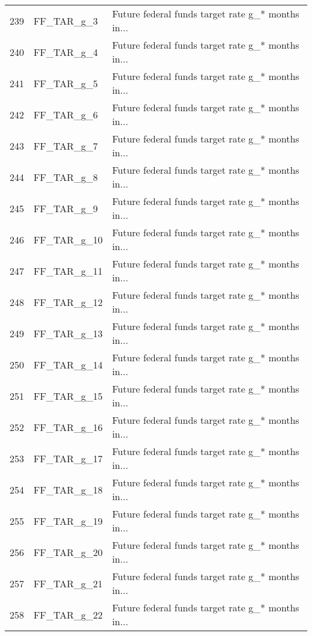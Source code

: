 \begin{tabular}{lll}
239 &                 FF\_TAR\_g\_3 &  Future federal funds target rate g\_* months in... \\
240 &                 FF\_TAR\_g\_4 &  Future federal funds target rate g\_* months in... \\
241 &                 FF\_TAR\_g\_5 &  Future federal funds target rate g\_* months in... \\
242 &                 FF\_TAR\_g\_6 &  Future federal funds target rate g\_* months in... \\
243 &                 FF\_TAR\_g\_7 &  Future federal funds target rate g\_* months in... \\
244 &                 FF\_TAR\_g\_8 &  Future federal funds target rate g\_* months in... \\
245 &                 FF\_TAR\_g\_9 &  Future federal funds target rate g\_* months in... \\
246 &                FF\_TAR\_g\_10 &  Future federal funds target rate g\_* months in... \\
247 &                FF\_TAR\_g\_11 &  Future federal funds target rate g\_* months in... \\
248 &                FF\_TAR\_g\_12 &  Future federal funds target rate g\_* months in... \\
249 &                FF\_TAR\_g\_13 &  Future federal funds target rate g\_* months in... \\
250 &                FF\_TAR\_g\_14 &  Future federal funds target rate g\_* months in... \\
251 &                FF\_TAR\_g\_15 &  Future federal funds target rate g\_* months in... \\
252 &                FF\_TAR\_g\_16 &  Future federal funds target rate g\_* months in... \\
253 &                FF\_TAR\_g\_17 &  Future federal funds target rate g\_* months in... \\
254 &                FF\_TAR\_g\_18 &  Future federal funds target rate g\_* months in... \\
255 &                FF\_TAR\_g\_19 &  Future federal funds target rate g\_* months in... \\
256 &                FF\_TAR\_g\_20 &  Future federal funds target rate g\_* months in... \\
257 &                FF\_TAR\_g\_21 &  Future federal funds target rate g\_* months in... \\
258 &                FF\_TAR\_g\_22 &  Future federal funds target rate g\_* months in... \\

\end{tabular}
